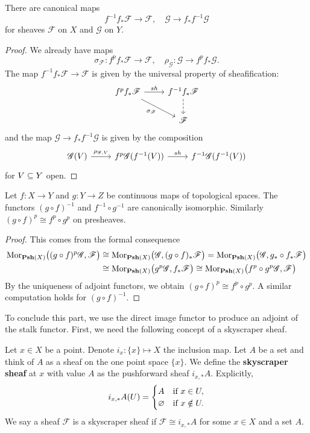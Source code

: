 \begin{proposition}
There are canonical maps 
\[f^{-1}f_*\mathscr{F}\to\mathscr{F},\quad \mathscr{G}\to f_*f^{-1}\mathscr{G}\]
for sheaves $\mathscr{F}$ on $X$ and $\mathscr{G}$ on $Y$.
\end{proposition}
\begin{proof}
We already have maps
\[\sigma_{\mathscr{F}}:f^pf_*\mathscr{F}\to\mathscr{F},\quad\rho_{\mathscr{G}}:\mathscr{G}\to f^pf_*\mathscr{G}.\]
The map $f^{-1}f_*\mathscr{F}\to\mathscr{F}$ is given by the universal property of sheafification:
\[\begin{tikzcd}
f^{p}f_*\mathscr{F}\ar[r,"sh"]\ar[rd,swap,"\sigma_{\mathscr{F}}"]&f^{-1}f_*\mathscr{F}\ar[d,dashed]\\
&\mathscr{F}
\end{tikzcd}\]
and the map $\mathscr{G}\to f_*f^{-1}\mathscr{G}$ is given by the composition
\[\begin{tikzcd}
\mathscr{G}(V)\ar[r,"\rho_{\mathscr{G},V}"]&f^p\mathscr{G}(f^{-1}(V))\ar[r,"sh"]&f^{-1}\mathscr{G}(f^{-1}(V))
\end{tikzcd}\]
for $V\subseteq Y$ open.
\end{proof}
\begin{proposition}\label{presheaf inverse image composition prop}
Let $f:X\to Y$ and $g:Y\to Z$ be continuous maps of topological spaces. The functors $(g\circ f)^{-1}$ and $f^{-1}\circ g^{-1}$ are canonically isomorphic. Similarly $(g\circ f)^p\cong f^{p}\circ g^p$ on presheaves.
\end{proposition}
\begin{proof}
This comes from the formal consequence
\begin{align*}
\mathrm{Mor}_{\mathbf{Psh}(X)}\big((g\circ f)^p\mathscr{G},\mathscr{F}\big)&\cong\mathrm{Mor}_{\mathbf{Psh}(X)}\big(\mathscr{G},(g\circ f)_*\mathscr{F}\big)=\mathrm{Mor}_{\mathbf{Psh}(X)}\big(\mathscr{G},g_*\circ f_*\mathscr{F}\big)\\
&\cong\mathrm{Mor}_{\mathbf{Psh}(X)}\big(g^p\mathscr{G},f_*\mathscr{F}\big)\cong\mathrm{Mor}_{\mathbf{Psh}(X)}\big(f^{p}\circ g^p\mathscr{G},\mathscr{F}\big)
\end{align*}
By the uniqueness of adjoint functors, we obtain $(g\circ f)^p\cong f^{p}\circ g^p$. A similar computation holds for $(g\circ f)^{-1}$.
\end{proof}
To conclude this part, we use the direct image functor to produce an adjoint of the stalk functor. First, we need the following concept of a skyscraper sheaf.
\begin{definition}
Let $x\in X$ be a point. Denote $i_x:\{x\}\mapsto X$ the inclusion map. Let $A$ be a set and think of $A$ as a sheaf on the one point space $\{x\}$. We define the \textbf{skyscraper sheaf} at $x$ with value $A$ as the pushforward sheaf $i_{x,*}A$. Explicitly,
\[i_{x,*}A(U)=\begin{cases}
A&\text{if }x\in U,\\
\varnothing&\text{if }x\notin U.
\end{cases}\]
We say a sheaf $\mathscr{F}$ is a skyscraper sheaf if $\mathscr{F}\cong i_{x,*}A$ for some $x\in X$ and a set $A$.
\end{definition}
